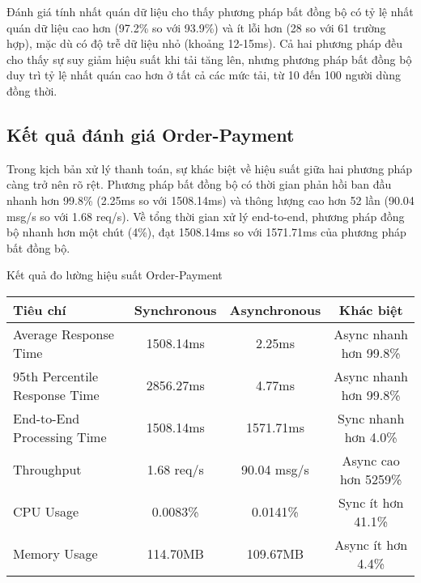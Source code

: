 Đánh giá tính nhất quán dữ liệu cho thấy phương pháp bất đồng bộ có tỷ lệ nhất quán dữ liệu cao hơn (97.2\% so với 93.9\%) và ít lỗi hơn (28 so với 61 trường hợp), mặc dù có độ trễ dữ liệu nhỏ (khoảng 12-15ms). Cả hai phương pháp đều cho thấy sự suy giảm hiệu suất khi tải tăng lên, nhưng phương pháp bất đồng bộ duy trì tỷ lệ nhất quán cao hơn ở tất cả các mức tải, từ 10 đến 100 người dùng đồng thời.

\subsection{Kết quả đánh giá Order-Payment}
Trong kịch bản xử lý thanh toán, sự khác biệt về hiệu suất giữa hai phương pháp càng trở nên rõ rệt. Phương pháp bất đồng bộ có thời gian phản hồi ban đầu nhanh hơn 99.8\% (2.25ms so với 1508.14ms) và thông lượng cao hơn 52 lần (90.04 msg/s so với 1.68 req/s). Về tổng thời gian xử lý end-to-end, phương pháp đồng bộ nhanh hơn một chút (4\%), đạt 1508.14ms so với 1571.71ms của phương pháp bất đồng bộ.

\begin{table}[h]{Kết quả đo lường hiệu suất Order-Payment}
    \centering
    {\setlength{\arrayrulewidth}{1pt}
    \renewcommand{\arraystretch}{1.5}
    \begin{tabular}{|l|c|c|c|}
        \hline
        \textbf{Tiêu chí}             & \textbf{Synchronous} & \textbf{Asynchronous} & \textbf{Khác biệt}     \\
        \hline
        Average Response Time         & 1508.14ms            & 2.25ms                & Async nhanh hơn 99.8\% \\
        95th Percentile Response Time & 2856.27ms            & 4.77ms                & Async nhanh hơn 99.8\% \\
        End-to-End Processing Time    & 1508.14ms            & 1571.71ms             & Sync nhanh hơn 4.0\%   \\
        Throughput                    & 1.68 req/s           & 90.04 msg/s           & Async cao hơn 5259\%   \\
        CPU Usage                     & 0.0083\%             & 0.0141\%              & Sync ít hơn 41.1\%     \\
        Memory Usage                  & 114.70MB             & 109.67MB              & Async ít hơn 4.4\%     \\
        \hline
    \end{tabular}}
\end{table}

